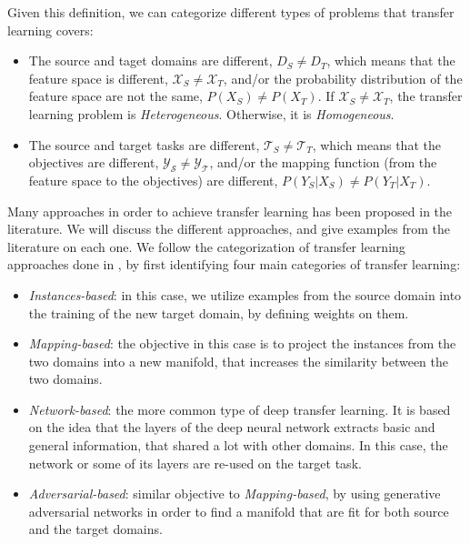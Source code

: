   \par Given this definition, we can categorize different types of problems that transfer learning covers:

  \begin{itemize}
      \item The source and taget domains are different, $D_S \neq D_T$, which means that the feature space is different, $\mathcal{X}_S \neq \mathcal{X}_T$, and/or the probability distribution of the feature space are not the same, $P(X_S) \neq P(X_T)$. If $\mathcal{X}_S \neq \mathcal{X}_T$, the transfer learning problem is \textit{Heterogeneous}. Otherwise, it is \textit{Homogeneous}.

      \item The source and target tasks are different, $\mathcal{T}_S \neq \mathcal{T}_T$, which means that the objectives are different, $\mathcal{Y_S} \neq \mathcal{Y_T}$, and/or the mapping function (from the feature space to the objectives) are different, $P(Y_S|X_S) \neq P(Y_T|X_T)$.
  \end{itemize}

  \par Many approaches in order to achieve transfer learning has been proposed in the literature. We will discuss the different approaches, and give examples from the literature on each one. We follow the categorization of transfer learning approaches done in \citep{dtl2018survey}, by first identifying four main categories of transfer learning:
  \begin{itemize}
    \item \textit{Instances-based}: in this case, we utilize examples from the source domain into the training of the new target domain, by defining weights on them.
    \item \textit{Mapping-based}: the objective in this case is to project the instances from the two domains into a new manifold, that increases the similarity between the two domains.
    \item \textit{Network-based}: the more common type of deep transfer learning. It is based on the idea that the layers of the deep neural network extracts basic and general information, that shared a lot with other domains. In this case, the network or some of its layers are re-used on the target task.
    \item \textit{Adversarial-based}: similar objective to \textit{Mapping-based}, by using generative adversarial networks \citep{goodfellow2014generative} in order to find a manifold that are fit for both source and the target domains.
  \end{itemize}

